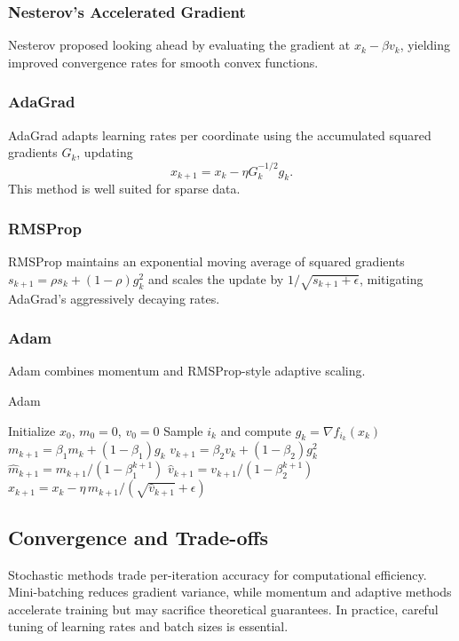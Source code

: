 \documentclass[11pt]{book}
\begin{document}
\subsubsection{Nesterov's Accelerated Gradient \cite{nesterov1983}}
Nesterov proposed looking ahead by evaluating the gradient at $x_k-\beta v_k$, yielding improved convergence rates for smooth convex functions.

\subsubsection{AdaGrad \cite{duchi2011}}
AdaGrad adapts learning rates per coordinate using the accumulated squared gradients $G_k$, updating
\begin{equation}
x_{k+1}=x_k-\eta G_k^{-1/2} g_k.
\end{equation}
This method is well suited for sparse data.

\subsubsection{RMSProp \cite{tieleman2012}}
RMSProp maintains an exponential moving average of squared gradients $s_{k+1}=\rho s_k+(1-\rho)g_k^2$ and scales the update by $1/\sqrt{s_{k+1}+\epsilon}$, mitigating AdaGrad's aggressively decaying rates.

\subsubsection{Adam \cite{kingma2015}}
Adam combines momentum and RMSProp-style adaptive scaling.

\begin{algorithm}
\caption{Adam}
\begin{algorithmic}[1]
\STATE Initialize $x_0$, $m_0=0$, $v_0=0$
    \STATE Sample $i_k$ and compute $g_k=\nabla f_{i_k}(x_k)$
    \STATE $m_{k+1}=\beta_1 m_k + (1-\beta_1)g_k$
    \STATE $v_{k+1}=\beta_2 v_k + (1-\beta_2)g_k^2$
    \STATE $\hat{m}_{k+1}=m_{k+1}/(1-\beta_1^{k+1})$
    \STATE $\hat{v}_{k+1}=v_{k+1}/(1-\beta_2^{k+1})$
    \STATE $x_{k+1}=x_k-\eta\,\hat{m}_{k+1}/(\sqrt{\hat{v}_{k+1}}+\epsilon)$
\ENDFOR
\end{algorithmic}
\end{algorithm}

\subsection{Convergence and Trade-offs}
Stochastic methods trade per-iteration accuracy for computational efficiency. Mini-batching reduces gradient variance, while momentum and adaptive methods accelerate training but may sacrifice theoretical guarantees. In practice, careful tuning of learning rates and batch sizes is essential.
\end{document}
